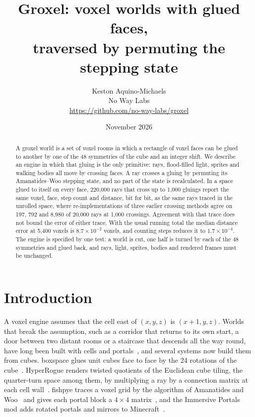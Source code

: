 \documentclass[10pt,a4paper]{article}
\title{Groxel: voxel worlds with glued faces,\\traversed by permuting the stepping state}
\author{Keston Aquino-Michaels\\ No Way Labs\\ {\small\url{https://github.com/no-way-labs/groxel}}}
\date{November 2026}
\begin{document}
\maketitle

\begin{abstract}
A groxel world is a set of voxel rooms in which a rectangle of voxel faces can be glued to
another by one of the 48 symmetries of the cube and an integer shift. We describe an engine in
which that gluing is the only primitive: rays, flood-filled light, sprites and walking bodies all
move by crossing faces. A ray crosses a gluing by permuting its Amanatides--Woo stepping state,
and no part of the state is recalculated. In a space glued to itself on every face, 220{,}000 rays
that cross up to 1{,}000 gluings report the same voxel, face, step count and distance, bit for
bit, as the same rays traced in the unrolled space, where re-implementations of three earlier
crossing methods agree on 197, 792 and 8{,}980 of 20{,}000 rays at 1{,}000 crossings. Agreement with
that trace does not bound the error of either trace. With the usual running total the
median distance error at 5{,}400 voxels is $8.7\times10^{-2}$ voxels, and counting steps reduces
it to $1.7\times10^{-4}$. The engine is specified by one test: a world is cut, one half is turned
by each of the 48 symmetries and glued back, and rays, light, sprites, bodies and rendered frames
must be unchanged.
\end{abstract}

\section{Introduction}

A voxel engine assumes that the cell east of $(x, y, z)$ is $(x+1, y, z)$. Worlds that break the
assumption, such as a corridor that returns to its own start, a door between two distant rooms or
a staircase that descends all the way round, have long been built with cells and
portals~\cite{luebke1995}, and several systems now build them from cubes. boxspace
glues unit cubes face to face by the 24 rotations of the cube~\cite{boxspace}. HyperRogue renders
twisted quotients of the Euclidean cube tiling, the quarter-turn space among them, by multiplying a
ray by a connection matrix at each cell wall~\cite{kopczynski2022}. fishpye traces a voxel grid by
the algorithm of Amanatides and Woo~\cite{amanatides1987} and gives each portal block a
$4\times4$ matrix~\cite{fishpye}, and the Immersive Portals mod adds rotated portals and mirrors
to Minecraft~\cite{immersiveportals}.
\end{document}
